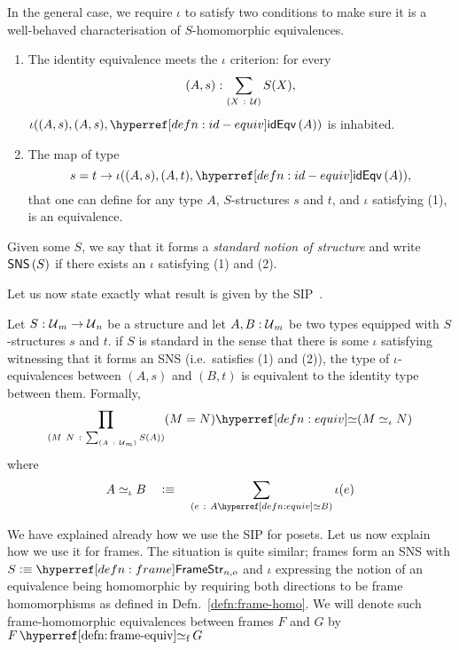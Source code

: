 In the general case, we require $\iota$ to satisfy two conditions to make sure it is a
well-behaved characterisation of $S$-homomorphic equivalences.
\begin{enumerate}
  \item The identity equivalence meets the $\iota$ criterion: for every $$(A,
    s)\hspace{0.1mm}:\hspace{0.1mm}\sum_{(X~:~\mathcal{U}{})} S(X),$$ $\iota((A, s), (A, s), \idequiv{A})$ is inhabited.
  \item The map of type
    \begin{equation*}
      s = t \rightarrow \iota((A, s), (A, t), \idequiv{A}),
    \end{equation*}
    that one can define for any type $A$, $S$-structures $s$ and $t$, and $\iota$ satisfying
    (1), is an equivalence.
\end{enumerate}

Given some $S$, we say that it forms a \emph{standard notion of structure} and write
$\mathsf{SNS}\left(S\right)$ if there exists an $\iota$ satisfying (1) and (2).

Let us now state exactly what result is given by the
SIP~\cite{escardo-uf-intro, agda-cubical}.
\begin{defn}
  Let $S\hspace{0.1mm}:\hspace{0.1mm}\mathcal{U}{}_m \rightarrow \mathcal{U}{}_n$ be a structure and let $A, B:\mathcal{U}{}_m$
  be two types equipped with $S$-structures $s$ and $t$. if $S$ is standard in the sense
  that there is some $\iota$ satisfying witnessing that it forms an SNS (i.e.~satisfies (1)
  and (2)), the type of $\iota$-equivalences between $(A, s)$ and $(B, t)$ is equivalent to
  the identity type between them. Formally,
  \begin{equation*}
    \pity{M~N}{\sigmaty{A}{\univ{}_m}{S(A)}}{\typequiv{(M = N)}{(M \simeq_{\iota} N)}}
  \end{equation*}
  where
  \begin{equation*}
    A \simeq_{\iota} B \quad\is\quad \sigmaty{e}{\typequiv{A}{B}}{\iota(e)}
  \end{equation*}
\end{defn}

We have explained already how we use the SIP for posets. Let us now explain how we use it
for frames. The situation is quite similar; frames form an SNS with $S \is
\framestrnm{}_{n, o}$ and $\iota$ expressing the notion of an equivalence being homomorphic by
requiring both directions to be frame homomorphisms as defined in
Defn.~\ref{defn:frame-homo}. We will denote such frame-homomorphic equivalences between
frames $F$ and $G$ by $\frameequiv{F}{G}$

